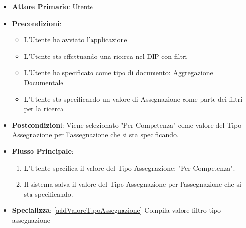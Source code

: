\begin{itemize}
      \item \textbf{Attore Primario}: Utente
      \item \textbf{Precondizioni}: 
      \begin{itemize}
            \item L'Utente ha avviato l'applicazione
            \item L'Utente sta effettuando una ricerca nel DIP con filtri
            \item L'Utente ha specificato come tipo di documento: Aggregazione Documentale
            \item L'Utente sta specificando un valore di Assegnazione come parte dei filtri per la ricerca
      \end{itemize}
      \item \textbf{Postcondizioni}: Viene selezionato "Per Competenza" come valore del Tipo Assegnazione per l'assegnazione che si sta specificando.
      \item \textbf{Flusso Principale}:
      \begin{enumerate}
            \item L'Utente specifica il valore del Tipo Assegnazione: "Per Competenza".
            \item Il sistema salva il valore del Tipo Assegnazione per l'assegnazione che si sta specificando.
      \end{enumerate}
      \item \textbf{Specializza}: \ref{addValoreTipoAssegnazione} Compila valore filtro tipo assegnazione
\end{itemize}


